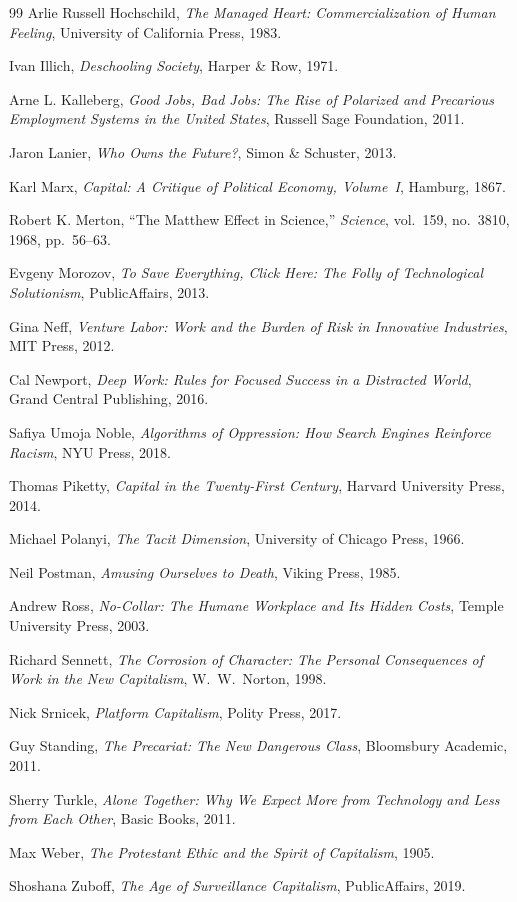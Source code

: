 \documentclass[12pt, a4paper]{article}
\theoremstyle{plain}
\theoremstyle{definition}
\theoremstyle{remark}
\begin{document}
\begin{thebibliography}{99}
Arlie Russell Hochschild,
\textit{The Managed Heart: Commercialization of Human Feeling},
University of California Press,
1983.

Ivan Illich,
\textit{Deschooling Society},
Harper \& Row,
1971.

Arne L. Kalleberg,
\textit{Good Jobs, Bad Jobs: The Rise of Polarized and Precarious Employment Systems in the United States},
Russell Sage Foundation,
2011.

Jaron Lanier,
\textit{Who Owns the Future?},
Simon \& Schuster,
2013.

Karl Marx,
\textit{Capital: A Critique of Political Economy, Volume~I},
Hamburg,
1867.

Robert K. Merton,
``The Matthew Effect in Science,''
\textit{Science},
vol.~159, no.~3810,
1968,
pp.~56--63.

Evgeny Morozov,
\textit{To Save Everything, Click Here: The Folly of Technological Solutionism},
PublicAffairs,
2013.

Gina Neff,
\textit{Venture Labor: Work and the Burden of Risk in Innovative Industries},
MIT Press,
2012.

Cal Newport,
\textit{Deep Work: Rules for Focused Success in a Distracted World},
Grand Central Publishing,
2016.

Safiya Umoja Noble,
\textit{Algorithms of Oppression: How Search Engines Reinforce Racism},
NYU Press,
2018.

Thomas Piketty,
\textit{Capital in the Twenty-First Century},
Harvard University Press,
2014.

Michael Polanyi,
\textit{The Tacit Dimension},
University of Chicago Press,
1966.

Neil Postman,
\textit{Amusing Ourselves to Death},
Viking Press,
1985.

Andrew Ross,
\textit{No-Collar: The Humane Workplace and Its Hidden Costs},
Temple University Press,
2003.

Richard Sennett,
\textit{The Corrosion of Character: The Personal Consequences of Work in the New Capitalism},
W.~W.~Norton,
1998.

Nick Srnicek,
\textit{Platform Capitalism},
Polity Press,
2017.

Guy Standing,
\textit{The Precariat: The New Dangerous Class},
Bloomsbury Academic,
2011.

Sherry Turkle,
\textit{Alone Together: Why We Expect More from Technology and Less from Each Other},
Basic Books,
2011.

Max Weber,
\textit{The Protestant Ethic and the Spirit of Capitalism},
1905.

Shoshana Zuboff,
\textit{The Age of Surveillance Capitalism},
PublicAffairs,
2019.

\end{thebibliography}
\end{document}
